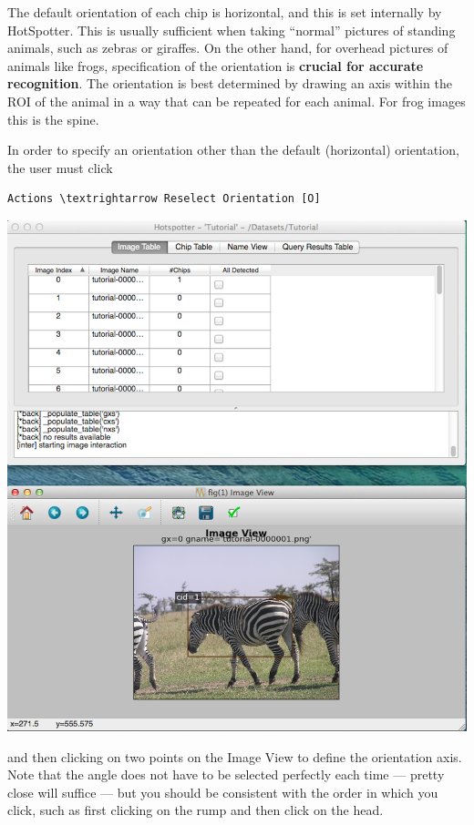 \documentclass[a4paper,10pt]{article}
\begin{document}
        The default orientation of each chip is horizontal, and this is set
        internally by HotSpotter.  This is usually sufficient when
        taking ``normal'' pictures of standing
        animals, such as zebras or giraffes.  On the other hand, for overhead
        pictures of animals like frogs, specification of the
        orientation is \textbf{crucial for accurate recognition}.  The
        orientation is best determined by drawing an axis within the
        ROI of the animal in a way that can be repeated for each
        animal.  For frog images this is the spine.

        In order to specify an orientation other than the default
        (horizontal) orientation, the user must click
        \begin{Verbatim}[commandchars=\\\{\}]
        Actions \textrightarrow Reselect Orientation [O]
        \end{Verbatim}
        \begin{center}
            \includegraphics[scale=0.13]{images/image.png}
        \end{center}

        \noindent
        and then clicking on two points on the Image View to define
        the orientation axis.  Note that the angle does not have to be
        selected perfectly each time --- pretty close will suffice ---
        but you should be consistent with the order in which you
        click, such as first clicking on the rump and then click on
        the head.
\end{document}

